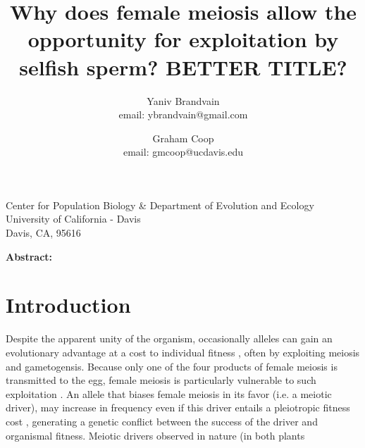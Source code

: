 \documentclass[12pt,letterpaper]{article}
\title{Why does female meiosis allow the opportunity for exploitation
  by selfish sperm? BETTER TITLE?}
\author{Yaniv Brandvain \\ email: ybrandvain@gmail.com  \and Graham Coop \\ email: gmcoop@ucdavis.edu }
\date{}
\newcommand{\yb}[1]{{ \color{blue} #1}}
\begin{document}
\maketitle
\begin{center}
Center for Population Biology \& Department of Evolution and Ecology \\ University of California - Davis \\ Davis, CA, 95616
\end{center}

{\bf Abstract:}
\newpage

\section*{Introduction}

Despite the apparent unity of the organism, occasionally alleles can
gain an evolutionary advantage at a cost to  individual fitness
\citep{Burt2006}, often by exploiting meiosis and gametogensis.
Because only one of the four products of female meiosis is transmitted to the egg, female meiosis \yb{is particularly vulnerable to such exploitation}  \citep{Sandler1957,Pardo-ManuelDeVillena2001a}. 
An allele that biases female meiosis in its favor (i.e. a meiotic driver), may increase in frequency even if this driver entails a pleiotropic fitness cost \citep{Prout1973}, generating a genetic conflict between the success of the driver and organismal fitness.
Meiotic drivers observed in nature (in both plants
\end{document}
